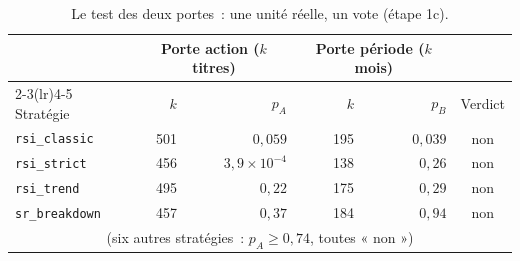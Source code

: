\begin{table}[H]
\centering
\caption{Le test des deux portes~: une unité réelle, un vote (étape 1c).}
\label{tab:b1-dep-portes}
\small
\begin{tabular}{@{}lrrrrc@{}}
\toprule
 & \multicolumn{2}{c}{Porte action ($k$ titres)} & \multicolumn{2}{c}{Porte période ($k$ mois)} & \\
\cmidrule(lr){2-3}\cmidrule(lr){4-5}
Stratégie & $k$ & $p_A$ & $k$ & $p_B$ & Verdict \\
\midrule
\texttt{rsi\_classic}  & 501 & $0{,}059$            & 195 & $0{,}039$ & non \\
\texttt{rsi\_strict}   & 456 & $3{,}9\times10^{-4}$ & 138 & $0{,}26$  & non \\
\texttt{rsi\_trend}    & 495 & $0{,}22$             & 175 & $0{,}29$  & non \\
\texttt{sr\_breakdown} & 457 & $0{,}37$             & 184 & $0{,}94$  & non \\
\multicolumn{6}{c}{\footnotesize (six autres stratégies~: $p_A \ge 0{,}74$, toutes « non »)} \\
\bottomrule
\end{tabular}
\end{table}

